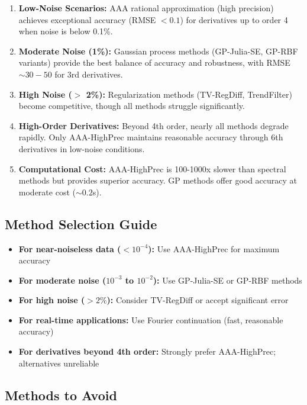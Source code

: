 \documentclass[11pt]{article}
\begin{document}
\begin{enumerate}
    \item \textbf{Low-Noise Scenarios:} AAA rational approximation (high precision) achieves exceptional accuracy (RMSE $< 0.1$) for derivatives up to order 4 when noise is below 0.1\%.

    \item \textbf{Moderate Noise (1\%):} Gaussian process methods (GP-Julia-SE, GP-RBF variants) provide the best balance of accuracy and robustness, with RMSE $\sim 30-50$ for 3rd derivatives.

    \item \textbf{High Noise ($>$ 2\%):} Regularization methods (TV-RegDiff, TrendFilter) become competitive, though all methods struggle significantly.

    \item \textbf{High-Order Derivatives:} Beyond 4th order, nearly all methods degrade rapidly. Only AAA-HighPrec maintains reasonable accuracy through 6th derivatives in low-noise conditions.

    \item \textbf{Computational Cost:} AAA-HighPrec is 100-1000x slower than spectral methods but provides superior accuracy. GP methods offer good accuracy at moderate cost ($\sim 0.2$s).
\end{enumerate}

\subsection{Method Selection Guide}

\begin{itemize}
    \item \textbf{For near-noiseless data ($< 10^{-4}$):} Use AAA-HighPrec for maximum accuracy
    \item \textbf{For moderate noise ($10^{-3}$ to $10^{-2}$):} Use GP-Julia-SE or GP-RBF methods
    \item \textbf{For high noise ($> 2\%$):} Consider TV-RegDiff or accept significant error
    \item \textbf{For real-time applications:} Use Fourier continuation (fast, reasonable accuracy)
    \item \textbf{For derivatives beyond 4th order:} Strongly prefer AAA-HighPrec; alternatives unreliable
\end{itemize}

\subsection{Methods to Avoid}
\end{document}

